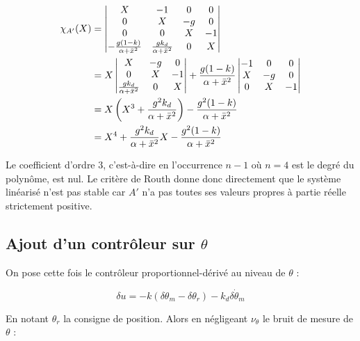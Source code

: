 \documentclass[10pt]{article}
\begin{document}
\begin{align}
	\chi_{A'} (X) &=
	\begin{vmatrix}
		X & -1 & 0 & 0 \\
		0 & X & -g & 0 \\
		0 & 0 & X & -1 \\
		- \frac{g(1 - k)}{\alpha + \bar x^2} & \frac{g k_d}{\alpha + \bar x^2} & 0 & X
	\end{vmatrix} \notag \\
	&= X \begin{vmatrix}
		X & -g & 0 \\
		0 & X & -1 \\
		\frac{g k_d}{\alpha + \bar x^2} & 0 & X
	\end{vmatrix} + 
	\frac{g(1 - k)}{\alpha + \bar x^2} \begin{vmatrix}
		-1 & 0 & 0 \\
		X & -g & 0 \\
		0 & X & -1
	\end{vmatrix} \notag \\
	&= X \left( X^3 + \frac{g^2 k_d}{\alpha + \bar x^2} \right) - \frac{g^2 (1 - k)}{\alpha + \bar x^2} \notag \\
	&= X^4 + \frac{g^2 k_d}{\alpha + \bar x^2} X - \frac{g^2 (1 - k)}{\alpha + \bar x^2} \notag
\end{align}

\noindent Le coefficient d'ordre $3$, c'est-à-dire en l'occurrence $n - 1$ où $n = 4$ est le degré du polynôme,
est nul. Le critère de Routh donne donc directement que le système linéarisé n'est pas stable car $A'$
n'a pas toutes ses valeurs propres à partie réelle strictement positive.

\subsection*{Ajout d'un contrôleur sur $\theta$}

On pose cette fois le contrôleur proportionnel-dérivé au niveau de $\theta$ :

\[
	\delta u = - k ( \delta \theta_m - \delta \theta_r ) - k_d \delta \dot \theta_m
\]

\noindent En notant $\theta_r$ la consigne de position. Alors en négligeant $\nu_{\theta}$ le bruit de mesure de $\theta$ :
\end{document}

